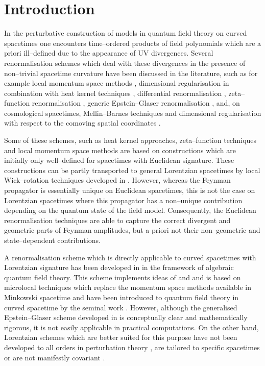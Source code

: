 \documentclass[a4paper,10pt,twoside]{article}
\numberwithin{equation}{section}
\newcounter{and}
\theoremstyle{plain}
\theoremstyle{definition}
\begin{document}
\tableofcontents


\section{Introduction}

In the perturbative construction of models in quantum field theory on curved spacetimes one encounters time--ordered products of field polynomials which are a priori ill--defined due to the appearance of UV divergences. Several renormalisation schemes which deal with these divergences in the presence of non--trivial spacetime curvature have been discussed in the literature, such as for example local momentum space methods \cite{Bunch:1981er}, dimensional regularisation in combination with heat kernel techniques \cite{Luscher:1982wf, Toms:1982af}, differential renormalisation \cite{Comellas:1994da,Prange:1997iy}, zeta--function renormalisation \cite{Bilal:2013iva}, generic Epstein--Glaser renormalisation \cite{Brunetti-Fredenhagen:2000, Hollands:2001nf, Hollands:2004yh}, and, on cosmological spacetimes, Mellin--Barnes techniques \cite{Hollands:2010pr} and dimensional regularisation with respect to the comoving spatial coordinates \cite{Baacke:2010bm}. 

Some of these schemes, such as heat kernel approaches, zeta--function techniques and local momentum space methods  are based on constructions which are initially only well--defined for spacetimes with Euclidean signature. These constructions can be partly transported to general Lorentzian spacetimes by local Wick--rotation techniques developed in \cite{Moretti:1999fb}. However, whereas the Feynman propagator is essentially unique on Euclidean spacetimes, this is not the case on Lorentzian spacetimes where this propagator has a non--unique contribution depending on the quantum state of the field model. Consequently, the Euclidean renormalisation techniques are able to capture the correct divergent and geometric parts of Feynman amplitudes, but a priori not their non--geometric and state--dependent contributions.

A renormalisation scheme which is directly applicable to curved spacetimes with Lorentzian signature has been developed in \cite{Brunetti-Fredenhagen:2000, Hollands:2001nf, Hollands:2004yh} in the framework of algebraic quantum field theory. This scheme implements ideas of \cite{EG} and \cite{Steinmann} and is based on microlocal techniques which replace the momentum space methods available in Minkowski spacetime and have been introduced to quantum field theory in curved spacetime by the seminal work \cite{Radzikowski}. However, although the generalised Epstein--Glaser scheme developed in \cite{Brunetti-Fredenhagen:2000, Hollands:2001nf, Hollands:2004yh} is conceptually clear and mathematically rigorous, it is not easily applicable in practical computations. On the other hand, Lorentzian schemes which are better suited for this purpose have not been developed to all orders in perturbation theory \cite{Comellas:1994da,Prange:1997iy}, are tailored to specific spacetimes \cite{Hollands:2010pr} or are not manifestly covariant \cite{Baacke:2010bm}.
\end{document}
